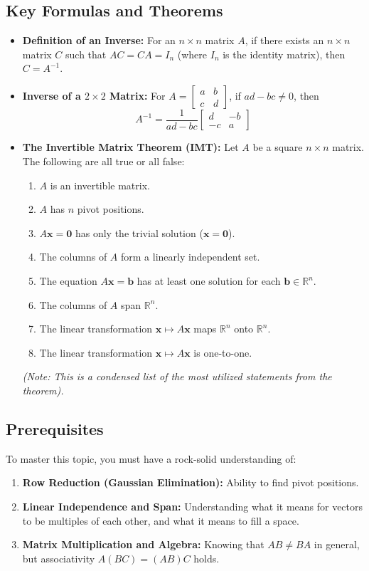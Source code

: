\documentclass[12pt]{article}
\begin{document}
\subsection{Key Formulas and Theorems}
\begin{itemize}
    \item \textbf{Definition of an Inverse:} For an $n \times n$ matrix $A$, if there exists an $n \times n$ matrix $C$ such that $AC = CA = I_n$ (where $I_n$ is the identity matrix), then $C = A^{-1}$.
    \item \textbf{Inverse of a $2 \times 2$ Matrix:} For $A = \begin{bmatrix} a & b \\ c & d \end{bmatrix}$, if $ad - bc \neq 0$, then 
    \[
    A^{-1} = \frac{1}{ad - bc} \begin{bmatrix} d & -b \\ -c & a \end{bmatrix}
    \]
    \item \textbf{The Invertible Matrix Theorem (IMT):} Let $A$ be a square $n \times n$ matrix. The following are all true or all false:
    \begin{enumerate}
        \item[(a)] $A$ is an invertible matrix.
        \item[(c)] $A$ has $n$ pivot positions.
        \item[(d)] $A\mathbf{x} = \mathbf{0}$ has only the trivial solution ($\mathbf{x} = \mathbf{0}$).
        \item[(e)] The columns of $A$ form a linearly independent set.
        \item[(g)] The equation $A\mathbf{x} = \mathbf{b}$ has at least one solution for each $\mathbf{b} \in \mathbb{R}^n$.
        \item[(h)] The columns of $A$ span $\mathbb{R}^n$.
        \item[(i)] The linear transformation $\mathbf{x} \mapsto A\mathbf{x}$ maps $\mathbb{R}^n$ onto $\mathbb{R}^n$.
        \item[(f)] The linear transformation $\mathbf{x} \mapsto A\mathbf{x}$ is one-to-one.
    \end{enumerate}
    \textit{(Note: This is a condensed list of the most utilized statements from the theorem).}
\end{itemize}

\subsection{Prerequisites}
To master this topic, you must have a rock-solid understanding of:
\begin{enumerate}
    \item \textbf{Row Reduction (Gaussian Elimination):} Ability to find pivot positions.
    \item \textbf{Linear Independence and Span:} Understanding what it means for vectors to be multiples of each other, and what it means to fill a space.
    \item \textbf{Matrix Multiplication and Algebra:} Knowing that $AB \neq BA$ in general, but associativity $A(BC) = (AB)C$ holds.
\end{enumerate}
\end{document}
